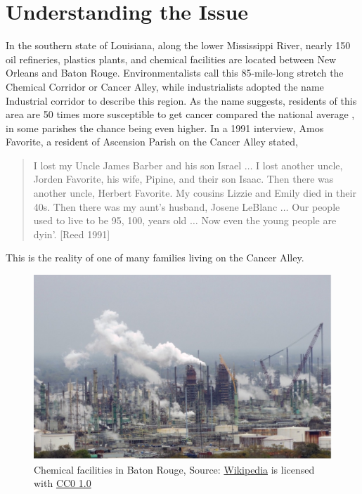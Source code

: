 \documentclass[a4paper, 11pt]{article}
\begin{document}
\section{Understanding the Issue}
%
%
	In the southern state of Louisiana, along the lower Mississippi River, nearly 150 oil refineries, plastics plants, and chemical facilities are located between New Orleans and Baton Rouge. Environmentalists call this 85-mile-long stretch the Chemical Corridor or Cancer Alley, while industrialists adopted the name Industrial corridor to describe this region. As the name suggests, residents of this area are 50 times more susceptible to get cancer compared the national average \cite{SM11}, in some parishes the chance being even higher. In a 1991 interview, Amos Favorite, a resident of Ascension Parish on the Cancer Alley stated,
	\begin{quotation}
		I lost my Uncle James Barber and his son Israel $\dots$ I lost another uncle, Jorden Favorite, his wife, Pipine, and their son Isaac. Then there was another uncle, Herbert Favorite. My cousins Lizzie and Emily died in their 40s. Then there was my aunt’s husband, Josene LeBlanc $\dots$ Our people used to live to be 95, 100, years old $\dots$ Now even the young people are dyin’. [Reed 1991]
	\end{quotation}
	This is the reality of one of many families living on the Cancer Alley.
%
	\begin{figure}[h!]
		\includegraphics[width=\linewidth]{Picture 1.jpg}
		\caption{Chemical facilities in Baton Rouge, Source: \href{https://en.wikipedia.org/wiki/Baton_Rouge_Refinery}{Wikipedia} is licensed with \href{https://creativecommons.org/publicdomain/zero/1.0/}{CC0 1.0}}
	\end{figure}
%	
\end{document}
